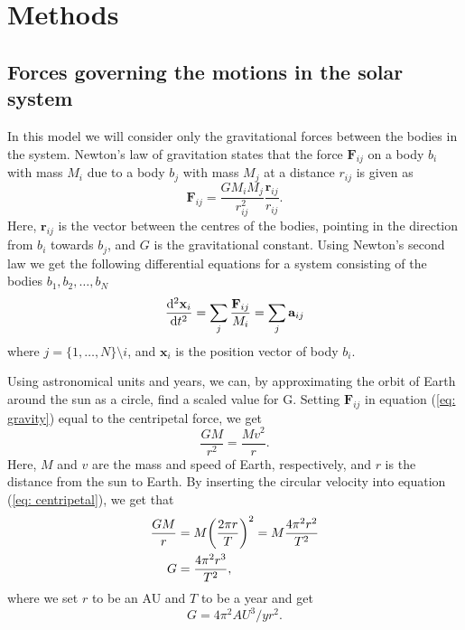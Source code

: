 \section{Methods}
\label{sec:methods}

\subsection{Forces governing the motions in the solar system}
In this model we will consider only the gravitational forces between the bodies in the system. Newton's law of gravitation states that the force $\mathbf{F}_{ij}$ on a body $b_i$ with mass $M_i$ due to a body $b_j$ with mass $M_j$ at a distance $r_{ij}$ is given as
\begin{equation}\label{eq: gravity}
	\mathbf{F}_{ij} = \frac{GM_iM_j}{r_{ij}^2}\frac{\mathbf{r}_{ij}}{r_{ij}}.
\end{equation}
Here, $\mathbf{r}_{ij}$ is the vector between the centres of the bodies, pointing in the direction from $b_i$ towards $b_j$, and $G$ is the gravitational constant. Using Newton's second law we get the following differential equations for a system consisting of the bodies $b_1,b_2,\ldots,b_N$
\begin{equation}\label{eq:diff}
	\dv[2]{\mathbf{x}_i}{t} = \sum_j \frac{\mathbf{F}_{ij}}{M_i} = \sum_j \mathbf{a}_{ij}
\end{equation}
where $j = \{1,\ldots,N\}\setminus i$, and $\mathbf{x}_i$ is the position vector of body $b_i$.

Using astronomical units and years, we can, by approximating the orbit of Earth around the sun as a circle, find a scaled value for G. Setting $\mathbf{F}_{ij}$ in equation (\ref{eq: gravity}) equal to the centripetal force, we get
\begin{equation}\label{eq: centripetal}
	\frac{GM}{r^2} = \frac{Mv^2}{r}.
\end{equation}
Here, $M$ and $v$ are the mass and speed of Earth, respectively, and $r$ is the distance from the sun to Earth. By inserting the circular velocity into equation (\ref{eq: centripetal}), we get that
 \begin{align}
	 \frac{GM}{r} &= M\qty(\frac{2\pi r}{T})^2 = M\frac{4 \pi^2 r^2}{T^2} \\
	 G &= \frac{4 \pi^2 r^3}{T^2},
 \end{align}
where we set $r$ to be an AU and $T$ to be a year and get
 \begin{equation}
	 G = 4 \pi ^2 AU^3/yr^2.
 \end{equation}

